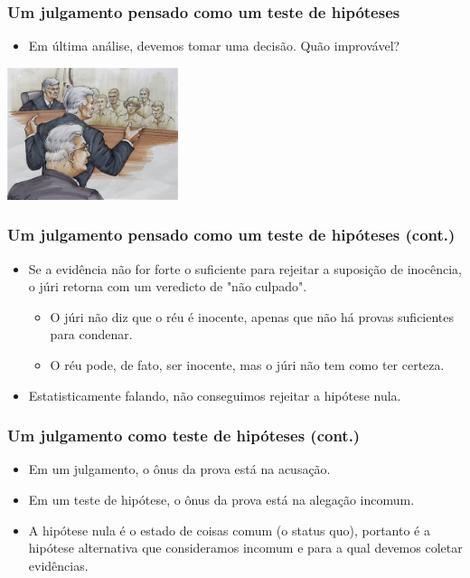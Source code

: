 \begin{frame}
\frametitle{Um julgamento pensado como um teste de hipóteses}
\begin{itemize}
\justifying
\item Em última análise, devemos tomar uma decisão. Quão improvável?

\end{itemize}
\justifying
\includegraphics[width=5cm]{1-8_gender_discrimination/trial.png}


\end{frame}


\begin{frame}
\frametitle{Um julgamento pensado como um teste de hipóteses (cont.)}

\begin{itemize}
\justifying
\item Se a evidência não for forte o suficiente para rejeitar a suposição de inocência, o júri retorna com um veredicto de "não culpado".
\begin{itemize}
\justifying
\item O júri não diz que o réu é inocente, apenas que não há provas suficientes para condenar.
\justifying
\item O réu pode, de fato, ser inocente, mas o júri não tem como ter certeza.

\end{itemize}
\justifying
\item Estatisticamente falando, não conseguimos rejeitar a hipótese nula.


\end{itemize}

\end{frame}


\begin{frame}
\frametitle{Um julgamento como teste de hipóteses (cont.)}

\begin{itemize}
\justifying
\item Em um julgamento, o ônus da prova está na acusação.
\justifying
\item Em um teste de hipótese, o ônus da prova está na alegação incomum.
\justifying
\item A hipótese nula é o estado de coisas comum (o status quo), portanto é a hipótese alternativa que consideramos incomum e para a qual devemos coletar evidências.

\end{itemize}

\end{frame}

